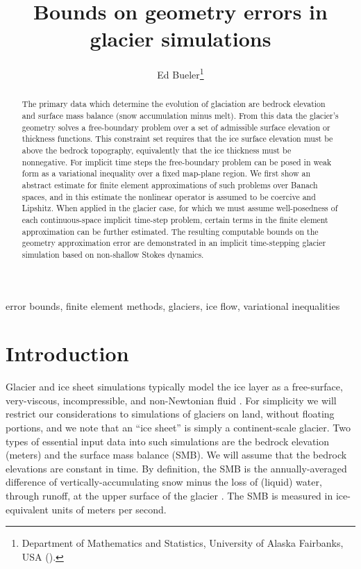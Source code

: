 \documentclass[hidelinks,onefignum,onetabnum,final]{siamart220329}  %
\title{Bounds on geometry errors in glacier simulations}
\author{Ed Bueler\thanks{Department of Mathematics and Statistics, University of Alaska Fairbanks, USA (\email{elbueler@alaska.edu}).}}
\begin{document}
\maketitle

\begin{abstract}
The primary data which determine the evolution of glaciation are bedrock elevation and surface mass balance (snow accumulation minus melt).  From this data the glacier's geometry solves a free-boundary problem over a set of admissible surface elevation or thickness functions.  This constraint set requires that the ice surface elevation must be above the bedrock topography, equivalently that the ice thickness must be nonnegative.  For implicit time steps the free-boundary problem can be posed in weak form as a variational inequality over a fixed map-plane region.  We first show an abstract estimate for finite element approximations of such problems over Banach spaces, and in this estimate the nonlinear operator is assumed to be coercive and Lipshitz.  When applied in the glacier case, for which we must assume well-posedness of each continuous-space implicit time-step problem, certain terms in the finite element approximation can be further estimated.  The resulting computable bounds on the geometry approximation error are demonstrated in an implicit time-stepping glacier simulation based on non-shallow Stokes dynamics.
\end{abstract}

\begin{keywords}
error bounds, finite element methods, glaciers, ice flow, variational inequalities
\end{keywords}



\section{Introduction} \label{sec:intro}

Glacier and ice sheet simulations typically model the ice layer as a free-surface, very-viscous, incompressible, and non-Newtonian fluid \cite{GreveBlatter2009,SchoofHewitt2013}.  For simplicity we will restrict our considerations to simulations of glaciers on land, without floating portions, and we note that an ``ice sheet'' is simply a continent-scale glacier.  Two types of essential input data into such simulations are the bedrock elevation (meters) and the surface mass balance (SMB).  We will assume that the bedrock elevations are constant in time.  By definition, the SMB is the annually-averaged difference of vertically-accumulating snow minus the loss of (liquid) water, through runoff, at the upper surface of the glacier \cite{Cogleyetal2011}.  The SMB is measured in ice-equivalent units of meters per second.
\end{document}
